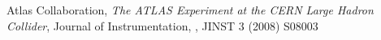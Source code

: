 \begin{thebibliography}{99}
 Atlas Collaboration, \textit{The {ATLAS} Experiment at the {CERN} Large Hadron Collider}, Journal of Instrumentation, , JINST 3 (2008) S08003
\end{thebibliography}

